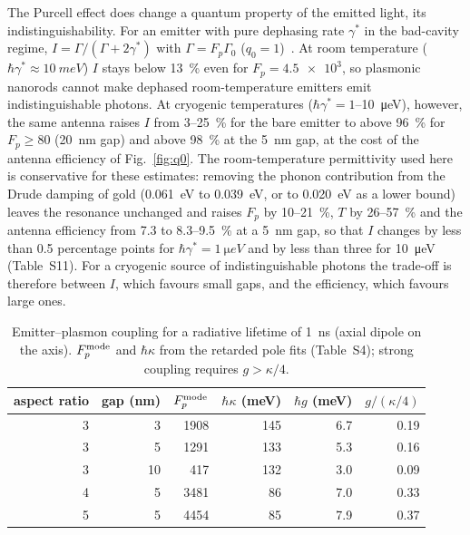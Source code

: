 \documentclass[11pt,a4paper]{article}
\newcommand{\Fp}{F_p}
\begin{document}
The Purcell effect does change a quantum property of the emitted light, its indistinguishability. For an emitter with
pure dephasing rate $\gamma^*$ in the bad-cavity regime, $I=\Gamma/(\Gamma+2\gamma^*)$ with $\Gamma=\Fp\Gamma_0$
($q_0=1$)~\cite{grange2015}. At room temperature ($\hbar\gamma^*\approx\SI{10}{meV}$) $I$ stays below
\SI{13}{\percent} even for $\Fp=\num{4.5e3}$, so plasmonic nanorods cannot make dephased room-temperature emitters
emit indistinguishable photons. At cryogenic temperatures ($\hbar\gamma^*=1$--\SI{10}{\micro eV}), however, the same
antenna raises $I$ from 3--\SI{25}{\percent} for the bare emitter to above \SI{96}{\percent} for $\Fp\geq80$
(\SI{20}{nm} gap) and above \SI{98}{\percent} at the \SI{5}{nm} gap, at the cost of the antenna efficiency of
Fig.~\ref{fig:q0}. The room-temperature permittivity used here is conservative for these estimates: removing the phonon
contribution from the Drude damping of gold (\SI{0.061}{eV} to \SI{0.039}{eV}, or to \SI{0.020}{eV} as a lower bound)
leaves the resonance unchanged and raises $\Fp$ by 10--\SI{21}{\percent}, $T$ by 26--\SI{57}{\percent} and the antenna
efficiency from 7.3 to 8.3--\SI{9.5}{\percent} at a \SI{5}{nm} gap, so that $I$ changes by less than 0.5 percentage points for
$\hbar\gamma^*=\SI{1}{\micro eV}$ and by less than three for \SI{10}{\micro eV} (Table~S11). For a cryogenic source of indistinguishable photons the trade-off is therefore between $I$, which
favours small gaps, and the efficiency, which favours large ones.

\begin{table}[t]\centering
\caption{Emitter--plasmon coupling for a radiative lifetime of \SI{1}{ns} (axial dipole on the axis).
$\Fp^{\rm mode}$ and $\hbar\kappa$ from the retarded pole fits (Table~S4); strong coupling requires $g>\kappa/4$.}\label{tab:quantum}
\begin{tabular}{rrrrrr}\toprule
aspect ratio & gap (nm) & $\Fp^{\rm mode}$ & $\hbar\kappa$ (meV) & $\hbar g$ (meV) & $g/(\kappa/4)$\\\midrule
3 & 3  & 1908 & 145 & 6.7 & 0.19\\
3 & 5  & 1291 & 133 & 5.3 & 0.16\\
3 & 10 & 417  & 132 & 3.0 & 0.09\\
4 & 5  & 3481 & 86  & 7.0 & 0.33\\
5 & 5  & 4454 & 85  & 7.9 & 0.37\\\bottomrule
\end{tabular}
\end{table}
\end{document}
